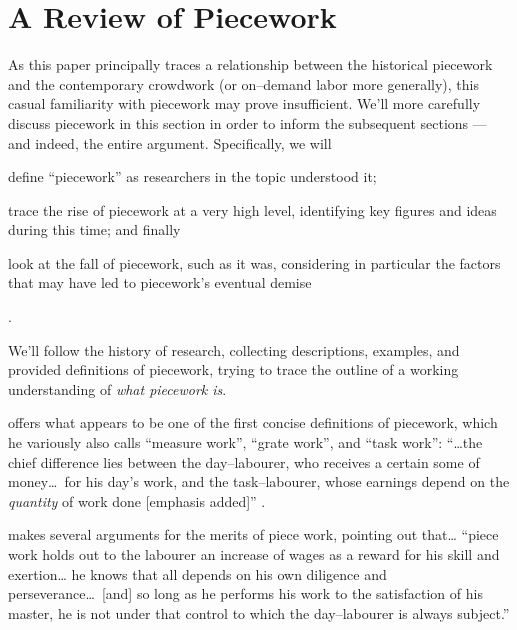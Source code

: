 \documentclass[trackingWork]{subfiles}
\begin{document}
\section{A Review of Piecework}
As this paper principally traces a relationship between
the historical piecework and the contemporary crowdwork
(or on--demand labor more generally),
this casual familiarity with piecework may prove insufficient.
We'll more carefully discuss piecework in this section in order
to inform the subsequent sections --- and indeed, the entire argument.
Specifically, we will
\begin{inlinelist}
  \item define ``piecework'' as researchers in the topic understood it;
  \item trace the rise of piecework at a very high level,
        identifying key figures and ideas during this time; and finally
  \item look at the fall of piecework, such as it was,
        considering in particular
        the factors that may have led to piecework's eventual demise
\end{inlinelist}.

We'll follow the history of research, collecting
descriptions,
examples, and
provided definitions of piecework, trying
to trace the outline of a working understanding of
\textit{what piecework is}.

\citeauthor{hughRaynbirdTaskWork} offers what appears to be
one of the first concise definitions of piecework,
which he variously also calls ``measure work'', ``grate work'', and ``task work'':
``\dots the chief difference lies between the day--labourer,
who receives a certain some of money\dots~for his day's work,
and the task--labourer, whose earnings depend on the \textit{quantity} of work done [emphasis added]''
\cite{hughRaynbirdTaskWork}.

\citeauthor{hughRaynbirdTaskWork} makes several arguments for the merits of piece work,
pointing out that\dots
``piece work holds out to the labourer an increase of wages as a reward for his skill and exertion\dots
he knows that all depends on his own diligence and perseverance\dots~[and]
so long as he performs his work to the satisfaction of his master,
he is not under that control to which the day--labourer is always subject.''
\end{document}
